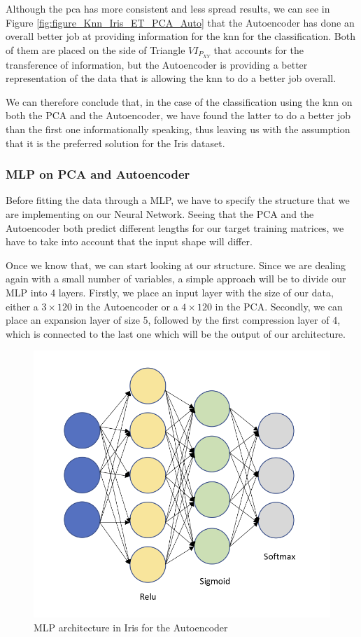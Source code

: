 Although the pca has more consistent and less spread results, we can see in Figure \ref{fig:figure_Knn_Iris_ET_PCA_Auto} that the Autoencoder has done an overall better job at providing information for the knn for the classification. Both of them are placed on the side of Triangle $VI_{P_{XY}}$ that accounts for the transference of information, but the Autoencoder is providing a better representation of the data that is allowing the knn to do a better job overall. \par

We can therefore conclude that, in the case of the classification using the  knn on both the PCA and the Autoencoder, we have found the latter to do a better job than the first one informationally speaking, thus leaving us with the assumption that it is the preferred solution for the Iris dataset.

\subsubsection{	MLP on PCA and Autoencoder}

Before fitting the data through a MLP, we have to specify the structure that we are implementing on our Neural Network. Seeing that the PCA and the Autoencoder both predict different lengths for our target training matrices, we have to take into account that the input shape will differ. \par

Once we know that, we can start looking at our structure. Since we are dealing again with a small number of variables, a simple approach will be to divide our MLP into 4 layers. Firstly, we place an input layer with the size of our data, either a $3\times120$ in the Autoencoder or a $4\times120$ in the PCA. Secondly, we can place an expansion layer of size 5, followed by the first compression layer of 4, which is connected to the last one which will be the output of our architecture. \par

\begin{figure}[H]
	
	\includegraphics[width=0.8\linewidth]{Figuras_tfg/Example_MLP_Auto.png}
	\caption{MLP architecture in Iris for the Autoencoder}
	\label{fig:figure_MLP_Iris_Autoencoder}
\end{figure}

